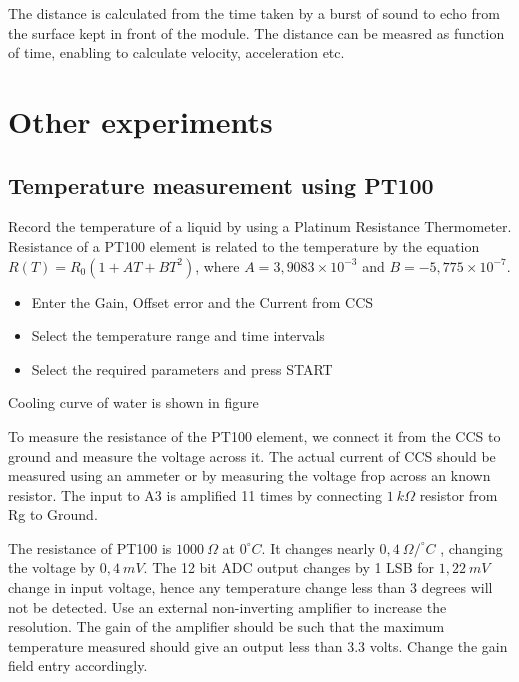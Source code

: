 \documentclass[a4paper,12pt,english]{sphinxmanual}
\let\sphinxpxdimen\pdfpxdimen\else\newdimen\sphinxpxdimen
\begin{document}

The distance is calculated from the time taken by a burst of sound to
echo from the surface kept in front of the module. The distance can be
measred as function of time, enabling to calculate velocity,
acceleration etc.


\chapter{Other experiments}
\label{\detokenize{index:other-experiments}}

\section{Temperature measurement using PT100}
\label{\detokenize{7.1:temperature-measurement-using-pt100}}\label{\detokenize{7.1::doc}}

Record the temperature of a liquid by using a Platinum Resistance
Thermometer. Resistance of a PT100 element is related to the temperature
by the equation \(R(T) = R_0 (1 + AT + BT^2)\), where
\(A = 3,9083 \times 10^{-3}\) and \(B =  - 5,775 \times 10^{-7}\).

\noindent\sphinxincludegraphics[width=300\sphinxpxdimen]{{pt100}.pdf}
\noindent\sphinxincludegraphics[width=300\sphinxpxdimen]{{pt100-screen}.pdf}

\begin{itemize}
\item {} 
Enter the Gain, Offset error and the Current from CCS

\item {} 
Select the temperature range and time intervals

\item {} 
Select the required parameters and press START

\end{itemize}


Cooling curve of water is shown in figure

To measure the resistance of the PT100 element, we connect it from the
CCS to ground and measure the voltage across it. The actual current of
CCS should be measured using an ammeter or by measuring the voltage frop
across an known resistor. The input to A3 is amplified 11 times by
connecting \(1~k\Omega\) resistor from Rg to Ground.

The resistance of PT100 is \(1000~\Omega\) at \(0^\circ C\). It changes nearly \(0,4~\Omega /^\circ C\)
, changing the voltage by \(0, 4~mV\). The 12 bit ADC output changes
by 1 LSB for \(1,22~mV\) change in input voltage, hence any temperature
change less than 3 degrees will not be detected. Use an external
non-inverting amplifier to increase the resolution. The gain of the
amplifier should be such that the maximum temperature measured should
give an output less than 3.3 volts. Change the gain field entry
accordingly.
\end{document}

